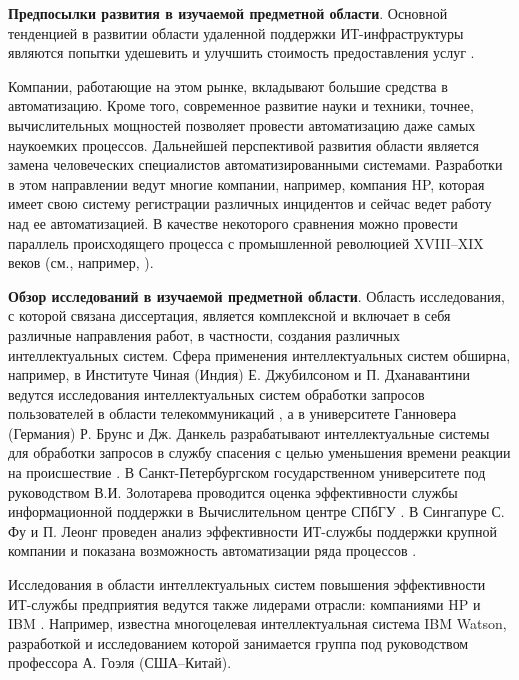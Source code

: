 \textbf{Предпосылки развития в изучаемой предметной области}. 
Основной тенденцией в развитии области удаленной поддержки ИТ-инфраструктуры являются попытки удешевить и улучшить стоимость предоставления услуг \cite{OutsourceEff}. \par
Компании, работающие на этом рынке, вкладывают большие средства в автоматизацию. Кроме того, современное развитие науки и техники, точнее, вычислительных мощностей \cite{SuperComputer} позволяет провести автоматизацию даже самых наукоемких процессов. Дальнейшей перспективой развития области является замена человеческих специалистов автоматизированными системами. Разработки в этом направлении ведут многие компании, например, компания HP, которая имеет свою систему регистрации различных инцидентов \cite{HPOpenView} и сейчас ведет работу над ее автоматизацией. В качестве некоторого сравнения можно провести параллель происходящего процесса с промышленной революцией XVIII–XIX веков (см., например, \cite{IndustrialRev}). \par
\textbf{Обзор исследований в изучаемой предметной области}. Область исследования, с которой связана диссертация, является комплексной и включает в себя различные направления работ, в частности, создания различных интеллектуальных систем. Сфера применения интеллектуальных систем обширна, например, в Институте Чиная (Индия) Е. Джубилсоном и П. Дханавантини ведутся исследования интеллектуальных систем обработки запросов пользователей в области телекоммуникаций \cite{CHIN-1}, а в университете Ганновера (Германия) Р. Брунс и Дж. Данкель разрабатывают интеллектуальные системы для обработки запросов в службу спасения с целью уменьшения времени реакции на происшествие \cite{Dunkel}. В Санкт-Петербургском государственном университете под руководством В.И. Золотарева проводится оценка эффективности службы информационной поддержки в Вычислительном центре СПбГУ \cite{SPB}. В Сингапуре С. Фу и П. Леонг проведен анализ эффективности ИТ-службы поддержки крупной компании и показана возможность автоматизации ряда процессов \cite{SING}.\par
Исследования в области интеллектуальных систем повышения эффективности ИТ-службы предприятия ведутся также лидерами отрасли: компаниями HP \cite{HPOpenView} и IBM \cite{WATSON-PO}. Например, известна многоцелевая интеллектуальная система IBM Watson, разработкой и исследованием которой занимается группа под руководством профессора А. Гоэля (США--Китай).  \par   

